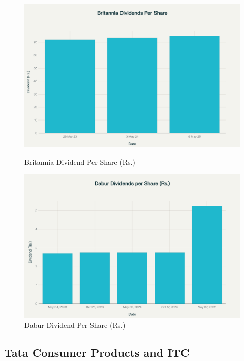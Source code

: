 \documentclass[12pt, a4paper]{report}
\begin{document}
\begin{figure}[H]
    \centering
    \begin{minipage}{0.48\textwidth}
        \centering
        \includegraphics[width=\textwidth]{assets/Dividend_Payout_Britania.png}
        \caption{Britannia Dividend Per Share (Rs.)}
    \end{minipage}
    \hfill
    \begin{minipage}{0.48\textwidth}
        \centering
        \includegraphics[width=\textwidth]{assets/Dividend_Payout_Dabur.png}
        \caption{Dabur Dividend Per Share (Rs.)}
    \end{minipage}
\end{figure}

\vspace{0.5cm}

\subsection*{Tata Consumer Products and ITC}
\end{document}
